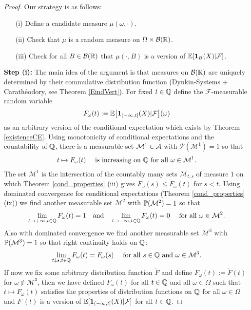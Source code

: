 \begin{proof}[Proof]
Our strategy is as follows:
			\begin{itemize}
				\item[(i)] Define a candidate measure $\mu(\omega,\cdot)$.
				\item[(ii)] Check that $\mu$ is a random measure on $\Omega \times \mathcal B(\R)$.
				\item[(iii)] Check for all $B\in \mathcal B(\R)$ that $\mu(\cdot,B)$ is a version of $\E[\mathbf 1_{B}(X)|\mathcal F]$.
			\end{itemize}
			\textbf{Step (i):} The main idea of the argument is that measures on $\mathcal B(\R)$ are uniquely determined by their commulative distribution function (Dynkin-Systems + Carath\'eodory, see Theorem \ref{EindVert}). For fixed $t\in\Q$ define the $\mathcal F$-measurable random variable
			\[ F_\omega(t):= \mathbb{E}\big[\mathbf 1_{(-\infty , t]}(X) | \cF\big](\omega) \]
			as an arbitrary version of the conditional expectation which exists by Theorem \ref{existenceCE}. Using monotonicity of conditional expectations and the countability of $\Q$, there is a measurable set $\cM^1\in \mathcal A$ with $\mathcal P(\mathcal M^1)=1$ so that 
			\begin{align*}
				t\mapsto F_\omega(t) \quad\text{ is increasing on $\Q$ for all }\omega \in \mathcal M^1.
			\end{align*}
			The set $\mathcal M^1$ is the intersection of the countably many sets $\mathcal M_{t,s}$ of measure $1$ on which Theorem \ref{cond_properties} (iii) gives $F_\omega(s)\leq F_\omega(t)$ for $s<t$. Using dominated convergence for conditional expectations (Theorem \ref{cond_properties} (ix)) we find another measurable set $\mathcal M^2$ with $\P(\mathcal M^2)=1$ so that
			\begin{align*}
				\lim_{t\to+\infty, t\in \Q} F_\omega(t)=1\quad \text{and}\quad 	\lim_{t\to-\infty, t\in \Q} F_\omega(t)=0\quad\text{ for all }\omega\in \mathcal M^2.
			\end{align*}
			Also with dominated convergence we find another measurable set $\mathcal M^3$ with $\P(\mathcal M^3)=1$ so that right-continuity holds on $\Q$:
			\begin{align*}
				\lim_{t\downarrow s, t\in \Q} F_\omega(t)=F_\omega(s) \quad \text{ for all } s \in \Q\text{ and }\omega \in \mathcal M^3.
			\end{align*}			
			If now we fix some arbitrary distribution function $\tilde F$ and define $F_\omega(t):=\tilde F(t)$ for $\omega \notin \mathcal M^3$, then we have defined $F_\omega(t)$ for all $t\in\Q$ and all $\omega \in \Omega$ such that $t\mapsto F_\omega(t)$ satisfies the properties of distribution functions on $\Q$ for all $\omega\in \Omega$ and $F_\cdot (t)$ is a version of $\E[\mathbf 1_{(-\infty,t]}(X)|\mathcal F]$ for all $t\in \Q$.\smallskip
			

\end{proof}
